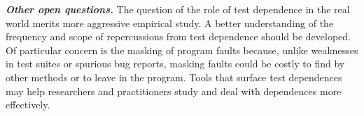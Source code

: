 \noindent \textbf{\textit{Other open questions.}}
The question of the role of test dependence in the real world merits
more aggressive empirical study.  A better understanding of the 
frequency and scope of repercussions from test dependence should be
developed.  Of particular concern is the
masking of program faults because, unlike weaknesses
in test suites or spurious bug reports, masking
faults could be costly to find by other methods or to leave in the program.
Tools that surface test dependences may help researchers
and practitioners study and deal with dependences more effectively.




 










